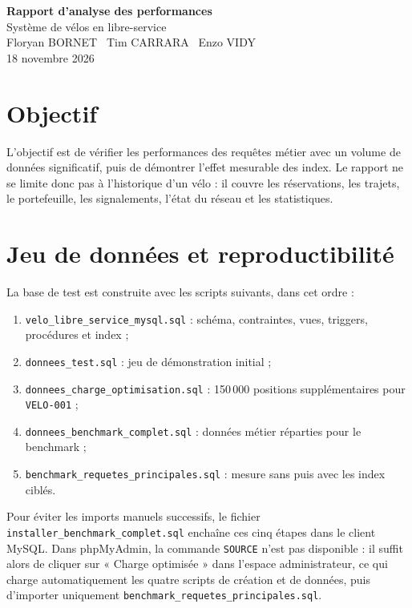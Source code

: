 \documentclass[11pt,a4paper]{article}
\begin{document}
\begin{center}
{\LARGE\textbf{Rapport d'analyse des performances}}\\[0.4em]
{\large Système de vélos en libre-service}\\[0.8em]
Floryan BORNET \textperiodcentered\ Tim CARRARA \textperiodcentered\ Enzo VIDY\\
18 novembre 2026
\end{center}

\section{Objectif}
L'objectif est de vérifier les performances des requêtes métier avec un volume de données significatif, puis de démontrer l'effet mesurable des index. Le rapport ne se limite donc pas à l'historique d'un vélo : il couvre les réservations, les trajets, le portefeuille, les signalements, l'état du réseau et les statistiques.

\section{Jeu de données et reproductibilité}
La base de test est construite avec les scripts suivants, dans cet ordre :
\begin{enumerate}
  \item \texttt{velo\_libre\_service\_mysql.sql} : schéma, contraintes, vues, triggers, procédures et index ;
  \item \texttt{donnees\_test.sql} : jeu de démonstration initial ;
  \item \texttt{donnees\_charge\_optimisation.sql} : 150\,000 positions supplémentaires pour \texttt{VELO-001} ;
  \item \texttt{donnees\_benchmark\_complet.sql} : données métier réparties pour le benchmark ;
  \item \texttt{benchmark\_requetes\_principales.sql} : mesure sans puis avec les index ciblés.
\end{enumerate}

Pour éviter les imports manuels successifs, le fichier \texttt{installer\_benchmark\_complet.sql} enchaîne ces cinq étapes dans le client MySQL. Dans phpMyAdmin, la commande \texttt{SOURCE} n'est pas disponible : il suffit alors de cliquer sur « Charge optimisée » dans l'espace administrateur, ce qui charge automatiquement les quatre scripts de création et de données, puis d'importer uniquement \texttt{benchmark\_requetes\_principales.sql}.
\end{document}
